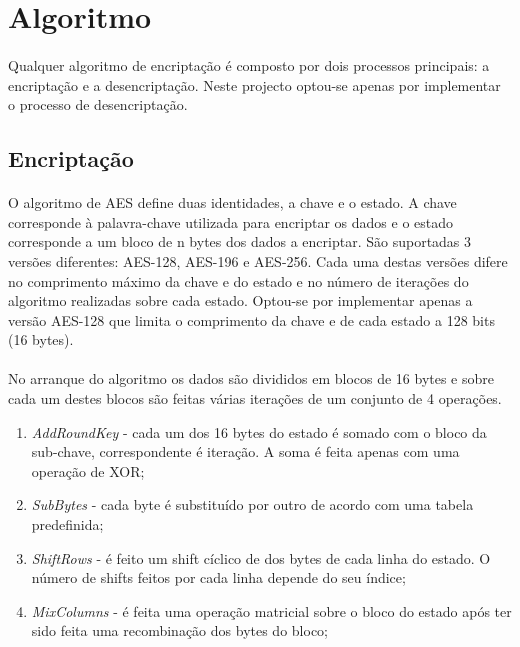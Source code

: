 \section{Algoritmo}

\paragraph{} Qualquer algoritmo de encriptação é composto por dois processos principais: a encriptação e a desencriptação. Neste projecto optou-se apenas por implementar o processo de desencriptação.

\subsection{Encriptação}

\paragraph{} O algoritmo de AES define duas identidades, a chave e o estado. A chave corresponde à palavra-chave utilizada para encriptar os dados e o estado corresponde a um bloco de n bytes dos dados a encriptar. São suportadas 3 versões diferentes: AES-128, AES-196 e AES-256. Cada uma destas versões difere no comprimento máximo da chave e do estado e no número de iterações do algoritmo realizadas sobre cada estado. Optou-se por implementar apenas a versão AES-128 que limita o comprimento da chave e de cada estado a 128 bits (16 bytes).

\paragraph{} No arranque do algoritmo os dados são divididos em blocos de 16 bytes e sobre cada um destes blocos são feitas várias iterações de um conjunto de 4 operações. 

\begin{enumerate}
\item \textit{AddRoundKey} - cada um dos 16 bytes do estado é somado com o bloco da sub-chave, correspondente é iteração. A soma é feita apenas com uma operação de XOR;
\item \textit{SubBytes} - cada byte é substituído por outro de acordo com uma tabela predefinida;
\item \textit{ShiftRows} - é feito um shift cíclico de dos bytes de cada linha do estado. O número de shifts feitos por cada linha depende do seu índice;
\item \textit{MixColumns} - é feita uma operação matricial sobre o bloco do estado após ter sido feita uma recombinação dos bytes do bloco;
\end{enumerate}

